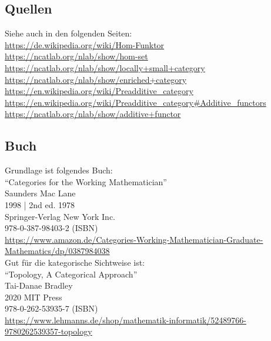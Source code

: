 \documentclass[a4paper]{amsart}
\theoremstyle{definition}
\begin{document}
\subsection*{Quellen}
Siehe auch in den folgenden Seiten:\\
\url{https://de.wikipedia.org/wiki/Hom-Funktor}\\
\url{https://ncatlab.org/nlab/show/hom-set}\\
\url{https://ncatlab.org/nlab/show/locally+small+category}\\
\url{https://ncatlab.org/nlab/show/enriched+category}\\
\url{https://en.wikipedia.org/wiki/Preadditive_category}\\
\url{https://en.wikipedia.org/wiki/Preadditive_category#Additive_functors}\\
\url{https://ncatlab.org/nlab/show/additive+functor}

\subsection*{Buch}
Grundlage ist folgendes Buch:\\
"`Categories for the Working Mathematician"'\\
Saunders Mac Lane\\
1998 | 2nd ed. 1978\\
Springer-Verlag New York Inc.\\
978-0-387-98403-2 (ISBN)\\
{\tiny
   \url{https://www.amazon.de/Categories-Working-Mathematician-Graduate-Mathematics/dp/0387984038}}\\

Gut für die kategorische Sichtweise ist:\\
"`Topology, A Categorical Approach"'\\
Tai-Danae Bradley\\
2020 MIT Press\\
978-0-262-53935-7 (ISBN)\\
{\tiny
\url{https://www.lehmanns.de/shop/mathematik-informatik/52489766-9780262539357-topology}}\\
\end{document}
